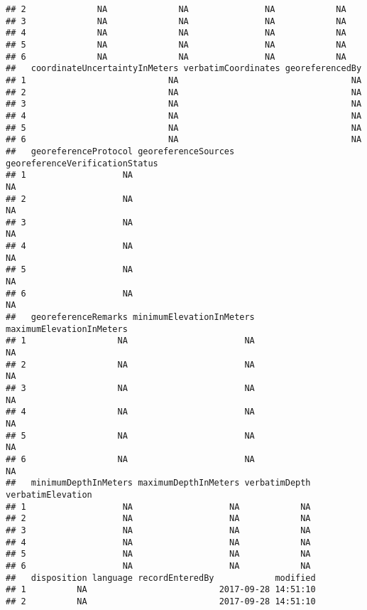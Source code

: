 \documentclass[
]{article}
\begin{document}
\begin{verbatim}
## 2              NA              NA               NA            NA
## 3              NA              NA               NA            NA
## 4              NA              NA               NA            NA
## 5              NA              NA               NA            NA
## 6              NA              NA               NA            NA
##   coordinateUncertaintyInMeters verbatimCoordinates georeferencedBy
## 1                            NA                                  NA
## 2                            NA                                  NA
## 3                            NA                                  NA
## 4                            NA                                  NA
## 5                            NA                                  NA
## 6                            NA                                  NA
##   georeferenceProtocol georeferenceSources georeferenceVerificationStatus
## 1                   NA                                                 NA
## 2                   NA                                                 NA
## 3                   NA                                                 NA
## 4                   NA                                                 NA
## 5                   NA                                                 NA
## 6                   NA                                                 NA
##   georeferenceRemarks minimumElevationInMeters maximumElevationInMeters
## 1                  NA                       NA                       NA
## 2                  NA                       NA                       NA
## 3                  NA                       NA                       NA
## 4                  NA                       NA                       NA
## 5                  NA                       NA                       NA
## 6                  NA                       NA                       NA
##   minimumDepthInMeters maximumDepthInMeters verbatimDepth verbatimElevation
## 1                   NA                   NA            NA                  
## 2                   NA                   NA            NA                  
## 3                   NA                   NA            NA                  
## 4                   NA                   NA            NA                  
## 5                   NA                   NA            NA                  
## 6                   NA                   NA            NA                  
##   disposition language recordEnteredBy            modified
## 1          NA                          2017-09-28 14:51:10
## 2          NA                          2017-09-28 14:51:10

\end{verbatim}
\end{document}
